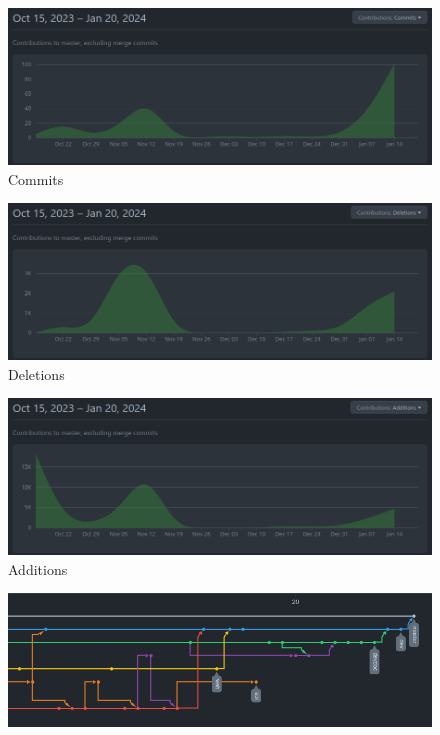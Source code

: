 		
			\begin{figure}[H]\centering
				\includegraphics[width=1\textwidth]{slike/image9.png}
				\caption{Commits}
			\end{figure}
			
			\begin{figure}[H]\centering
				\includegraphics[width=1\textwidth]{slike/image10.png}
				\caption{Deletions}
			\end{figure}
			 
			\begin{figure}[H]\centering
				\includegraphics[width=1\textwidth]{slike/image11.png}
				\caption{Additions}
			\end{figure}
		
			\begin{figure}[H]\centering
				\includegraphics[width=1\textwidth]{slike/image12.png}
				\caption{}
			\end{figure}
			
			
		